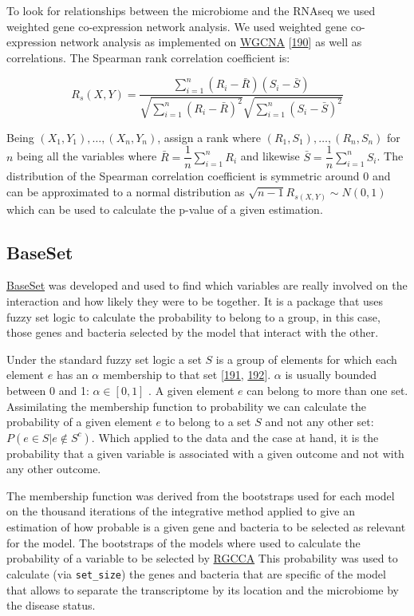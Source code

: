 \documentclass[
  12pt,
  a4paper,
  twoside,
  openright]{book}
\begin{document}
To look for relationships between the microbiome and the RNAseq we used weighted gene co-expression network analysis.
We used weighted gene co-expression network analysis as implemented on \href{https://cran.r-project.org/package=WGCNA}{WGCNA} {[}\protect\hyperlink{ref-langfelder2008}{190}{]} as well as correlations.
The Spearman rank correlation coefficient is:

\[
R_s(X,Y) = \dfrac{\sum_{i=1}^n (R_i - \bar{R}) (S_i - \bar{S} )}{\sqrt{\sum_{i=1}^n (R_i - \bar{R})^2}\sqrt{\sum_{i=1}^n (S_i - \bar{S})^2}}
\]

Being \((X_1 , Y_1 ),\dots, (X_n , Y_n)\), assign a rank where \((R_1 , S_1 ), \dots , (R_n , S_n )\) for \(n\) being all the variables where \(\bar{R}=\dfrac{1}{n}\sum_{i=1}^n R_i\) and likewise \(\bar{S}=\dfrac{1}{n}\sum_{i=1}^n S_i\).
The distribution of the Spearman correlation coefficient is symmetric around 0 and can be approximated to a normal distribution as \(\sqrt{n-1}R_{s(X,Y)} \sim N(0,1)\) which can be used to calculate the p-value of a given estimation.

\hypertarget{baseset}{%
\subsection{BaseSet}\label{baseset}}

\href{https://cran.r-project.org/package=BaseSet}{BaseSet} was developed and used to find which variables are really involved on the interaction and how likely they were to be together.
It is a package that uses fuzzy set logic to calculate the probability to belong to a group, in this case, those genes and bacteria selected by the model that interact with the other.

Under the standard fuzzy set logic a set \(S\) is a group of elements for which each element \(e\) has an \(\alpha\) membership to that set {[}\protect\hyperlink{ref-filzmoser2004}{191}, \protect\hyperlink{ref-dubois1993}{192}{]}.
\(\alpha\) is usually bounded between 0 and 1: \(\alpha \in [0, 1]\) .
A given element \(e\) can belong to more than one set.
Assimilating the membership function to probability we can calculate the probability of a given element \(e\) to belong to a set \(S\) and not any other set: \(P(e \in S|e \not \in S^c)\).
Which applied to the data and the case at hand, it is the probability that a given variable is associated with a given outcome and not with any other outcome.

The membership function was derived from the bootstraps used for each model on the thousand iterations of the integrative method applied to give an estimation of how probable is a given gene and bacteria to be selected as relevant for the model.
The bootstraps of the models where used to calculate the probability of a variable to be selected by \protect\hyperlink{acronyms_RGCCA}{RGCCA}
This probability was used to calculate (via \texttt{set\_size}) the genes and bacteria that are specific of the model that allows to separate the transcriptome by its location and the microbiome by the disease status.
\end{document}
